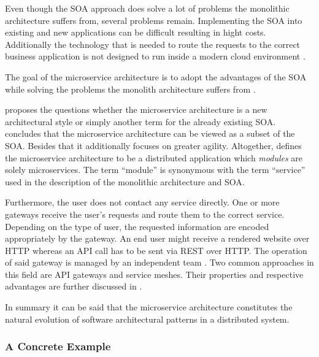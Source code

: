 Even though the \ac{SOA} approach does solve a lot of problems the monolithic
architecture suffers from, several problems remain. Implementing the \ac{SOA}
into existing and new applications can be difficult resulting in hight costs.
Additionally the technology that is needed to route the requests to the correct
business application is not designed to run inside a modern cloud environment
\autocite[p. 584]{VillamizarEvaluatingmonolithicmicroservice2015}.

The goal of the microservice architecture is to adopt the advantages of the
\ac{SOA} while solving the problems the monolith architecture suffers from
\autocite[p. 584]{VillamizarEvaluatingmonolithicmicroservice2015}.

\autocite{VillamizarEvaluatingmonolithicmicroservice2015} proposes the
questions whether the microservice architecture is a new architectural style or
simply another term for the already existing \ac{SOA}.
\autocite{VillamizarEvaluatingmonolithicmicroservice2015} concludes that the
microservice architecture can be viewed as a subset of the \ac{SOA}. Besides
that it additionally focuses on greater agility. Altogether,
\autocite{DragoniMicroservicesyesterdaytoday2016} defines the microservice
architecture to be a distributed application which \textit{modules} are solely
microservices. The term \enquote{module} is synonymous with the term
\enquote{service} used in the description of the monolithic architecture and
\ac{SOA}.

Furthermore, the user does not contact any service directly. One or more
gateways receive the user's requests and route them to the correct service.
Depending on the type of user, the requested information are encoded
appropriately by the gateway. An end user might receive a rendered website over
\ac{HTTP} whereas an \ac{API} call has to be sent via \ac{REST} over \ac{HTTP}.
The operation of said gateway is managed by an independent team \autocite[p.
585]{VillamizarEvaluatingmonolithicmicroservice2015}. Two common approaches in
this field are \ac{API} gateways and service meshes. Their properties and
respective advantages are further discussed in
\autocite{HariharaSubramanianHandsRESTfulAPI2019}.

In summary it can be said that the microservice architecture constitutes the
natural evolution of software architectural patterns in a distributed system.

\subsubsection{A Concrete Example}%
\label{ssub:A_Practical_Example}

